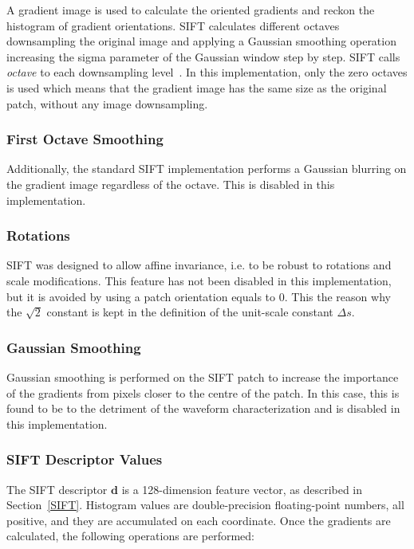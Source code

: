 \documentclass[review]{elsarticle}
\begin{document}
A gradient image is used to calculate the oriented gradients and reckon the histogram of gradient orientations.   SIFT calculates different octaves downsampling the original image and applying a Gaussian smoothing operation increasing the sigma parameter of the Gaussian window step by step.  SIFT calls \textit{octave} to each downsampling level~\cite{Lowe2004,Rey-Otero2014}. In this implementation, only the zero octaves is used which means that the gradient image has the same size as the original patch, without any image downsampling.

\subsubsection{First Octave Smoothing}

Additionally, the standard SIFT implementation performs a Gaussian blurring on the gradient image regardless of the octave.  This is disabled in this implementation.

\subsubsection{Rotations}

SIFT was designed to allow affine invariance, i.e. to be robust to rotations and scale modifications.  This feature has not been disabled in this implementation, but it is avoided by using a patch orientation equals to $0$.  This the reason why the $\sqrt{2}$ constant is kept in the definition of the unit-scale constant $\Delta s$.

\subsubsection{Gaussian Smoothing}

Gaussian smoothing is performed on the SIFT patch to increase the importance of the gradients from pixels closer to the centre of the patch.  In this case, this is found to be to the detriment of the waveform characterization and is disabled in this implementation.

\subsubsection{SIFT Descriptor Values}

The SIFT descriptor $\mathbf{d}$ is a 128-dimension feature vector, as described in Section~\ref{SIFT}.  Histogram values are double-precision floating-point numbers, all positive, and they are accumulated on each coordinate.  Once the gradients are calculated, the following operations are performed:
\end{document}
